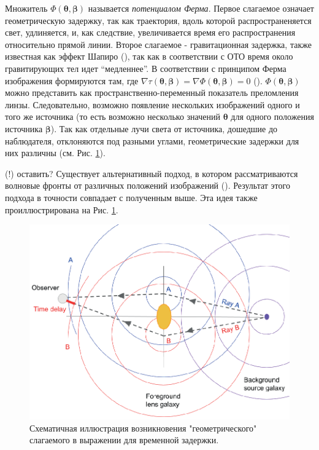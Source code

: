 Множитель $\Phi(\boldsymbol{\theta},\boldsymbol{\beta})$ называется \textit{потенциалом Ферма}. Первое слагаемое означает геометрическую задержку, так как траектория, вдоль которой распространеняется свет, удлиняется, и, как следствие, увеличивается время его распространения относительно прямой линии. Второе слагаемое - гравитационная задержка, также известная как эффект Шапиро (\cite{shapiro1964}), так как в соответствии с ОТО время около гравитирующих тел идет “медленнее”. В соответствии с принципом Ферма изображения формируются там, где $\nabla \tau(\boldsymbol{\theta}, \boldsymbol{\beta}) = \nabla \Phi(\boldsymbol{\theta}, \boldsymbol{\beta}) = 0 $ (\cite{schneider1985}). $\Phi(\boldsymbol{\theta},\boldsymbol{\beta})$ можно представить как пространственно-переменный показатель преломления линзы. Следовательно, возможно появление нескольких изображений  одного и того же источника (то есть возможно несколько значений $\boldsymbol{\theta}$ для одного положения источника $\boldsymbol{\beta}$). Так как отдельные лучи света от источника, дошедшие до наблюдателя, отклоняются под разными углами, геометрические задержки для них различны (см. Рис. \ref{fig:timedelayorigin}).

(!) оставить? 
Существует альтернативный подход, в котором рассматриваются волновые фронты от различных положений изображений (\cite{kayzerrefsdal1983}). Результат этого подхода в точности совпадает с полученным выше. Эта идея также проиллюстрирована на Рис. \ref{fig:timedelayorigin}.


\begin{figure}[h]
    \centering
	\includegraphics[scale=1.0]{pics/timedelayorigin.eps}
	\caption{Схематичная иллюстрация возникновения "геометрического" слагаемого в выражении для временной задержки. \label{fig:timedelayorigin} }
   \end{figure} 


